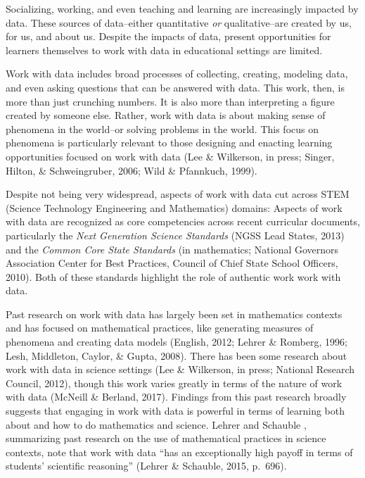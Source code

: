 \documentclass[]{msu-thesis}
\theoremstyle{definition}
\theoremstyle{definition}
\theoremstyle{definition}
\theoremstyle{remark}
\begin{document}
Socializing, working, and even teaching and learning are increasingly
impacted by data. These sources of data--either quantitative \emph{or}
qualitative--are created by us, for us, and about us. Despite the
impacts of data, present opportunities for learners themselves to work
with data in educational settings are limited.

Work with data includes broad processes of collecting, creating,
modeling data, and even asking questions that can be answered with data.
This work, then, is more than just crunching numbers. It is also more
than interpreting a figure created by someone else. Rather, work with
data is about making sense of phenomena in the world--or solving
problems in the world. This focus on phenomena is particularly relevant
to those designing and enacting learning opportunities focused on work
with data (Lee \& Wilkerson, in press; Singer, Hilton, \& Schweingruber,
2006; Wild \& Pfannkuch, 1999).

Despite not being very widespread, aspects of work with data cut across
STEM (Science Technology Engineering and Mathematics) domains: Aspects
of work with data are recognized as core competencies across recent
curricular documents, particularly the \emph{Next Generation Science
Standards} (NGSS Lead States, 2013) and the \emph{Common Core State
Standards} (in mathematics; National Governors Association Center for
Best Practices, Council of Chief State School Officers, 2010). Both of
these standards highlight the role of authentic work work with data.

Past research on work with data has largely been set in mathematics
contexts and has focused on mathematical practices, like generating
measures of phenomena and creating data models (English, 2012; Lehrer \&
Romberg, 1996; Lesh, Middleton, Caylor, \& Gupta, 2008). There has been
some research about work with data in science settings (Lee \&
Wilkerson, in press; National Research Council, 2012), though this work
varies greatly in terms of the nature of work with data (McNeill \&
Berland, 2017). Findings from this past research broadly suggests that
engaging in work with data is powerful in terms of learning both about
and how to do mathematics and science. Lehrer and Schauble , summarizing
past research on the use of mathematical practices in science contexts,
note that work with data ``has an exceptionally high payoff in terms of
students' scientific reasoning'' (Lehrer \& Schauble, 2015, p.~696).
\end{document}

